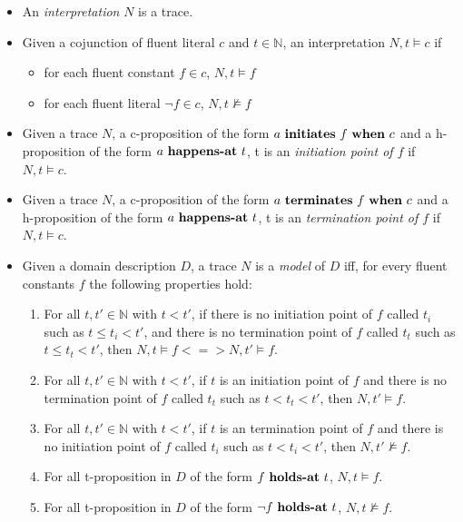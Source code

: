 \begin{itemize}
  \item An \emph{interpretation} $N$ is a trace.
  \item Given a cojunction of fluent literal $c$ and $t \in \mathbb{N}$, an interpretation $N,t \vDash c$ if
    \begin{itemize}
      \item for each fluent constant $f\in c$, $N,t \vDash f$
      \item for each fluent literal $\neg f\in c$, $N,t \nvDash f$
    \end{itemize}
  \item Given a trace $N$, a c-proposition of the form $a \text{ \textbf{initiates} } f \text{ \textbf{when} } c$ and a h-proposition of the form $a \text{ \textbf{happens-at} } t$, t is an \emph{initiation point of $f$} if $N,t \vDash c$.
  \item Given a trace $N$, a c-proposition of the form $a \text{ \textbf{terminates} } f \text{ \textbf{when} } c$ and a h-proposition of the form $a \text{ \textbf{happens-at} } t$, t is an \emph{termination point of $f$} if $N,t \vDash c$.
  \item Given a domain description $D$, a trace $N$ is a \emph{model} of $D$ iff, for every fluent constants $f$ the following properties hold:
  \begin{enumerate}
    \item For all $t,t'\in \mathbb{N}$ with $t<t'$, if there is no initiation point of $f$ called $t_i$ such as $t \leq t_i < t'$, and there is no termination point of $f$ called $t_t$ such as $t \leq t_t < t'$, then $N,t \vDash f <=> N,t' \vDash f$.
    \item For all $t,t'\in \mathbb{N}$ with $t<t'$, if $t$ is an initiation point of $f$ and there is no termination point of $f$ called $t_t$ such as $t < t_t < t'$, then $N,t' \vDash f$.
    \item For all $t,t'\in \mathbb{N}$ with $t<t'$, if $t$ is an termination point of $f$ and there is no initiation point of $f$ called $t_i$ such as $t < t_i < t'$, then $N,t' \nvDash f$.
    \item For all t-proposition in $D$ of the form $f \text{ \textbf{holds-at} } t$, $N,t \vDash f$.
    \item For all t-proposition in $D$ of the form $\neg f \text{ \textbf{holds-at} } t$, $N,t \nvDash f$.
  \end{enumerate}
\end{itemize}

